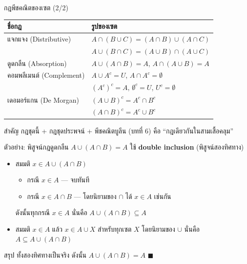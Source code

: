 \begin{frame}{กฎพีชคณิตของเซต (2/2)}
  \begin{center}\small
  \begin{tabular}{|l|l|}
    \hline
    \textbf{ชื่อกฎ} & \textbf{รูปของเซต} \\ \hline
    แจกแจง (Distributive) & $A \cap (B \cup C) = (A \cap B) \cup (A \cap C)$ \\ \hline
                          & $A \cup (B \cap C) = (A \cup B) \cap (A \cup C)$ \\ \hline
    ดูดกลืน (Absorption) & $A \cup (A \cap B) = A$, \quad $A \cap (A \cup B) = A$ \\ \hline
    คอมพลีเมนต์ (Complement) & $A \cup A^c = U$, \quad $A \cap A^c = \emptyset$ \\ \hline
                             & $(A^c)^c = A$, \quad $\emptyset^c = U$, \quad $U^c = \emptyset$ \\ \hline
    เดอมอร์แกน (De Morgan) & $(A \cup B)^c = A^c \cap B^c$ \\ \hline
                            & $(A \cap B)^c = A^c \cup B^c$ \\ \hline
  \end{tabular}
  \end{center}
  \vspace{0.3em}
  \begin{exampleblock}{สำคัญ}
    กฎชุดนี้ + กฎชุดประพจน์ + พีชคณิตบูลีน (บทที่ 6) คือ ``กฎเดียวกันในสามเสื้อคลุม''
  \end{exampleblock}
\end{frame}

\begin{frame}{ตัวอย่าง: พิสูจน์กฎดูดกลืน $A \cup (A \cap B) = A$}
  ใช้ \textbf{double inclusion} (พิสูจน์สองทิศทาง)
  \vspace{0.2em}
  \begin{itemize}
    \item[($\subseteq$)] สมมติ $x \in A \cup (A \cap B)$
      \begin{itemize}
        \item กรณี $x \in A$ --- จบทันที
        \item กรณี $x \in A \cap B$ --- โดยนิยามของ $\cap$ ได้ $x \in A$ เช่นกัน
      \end{itemize}
      ดังนั้นทุกกรณี $x \in A$ \quad นั่นคือ $A \cup (A \cap B) \subseteq A$
    \item[($\supseteq$)] สมมติ $x \in A$ แล้ว $x \in A \cup X$ สำหรับทุกเซต $X$
      โดยนิยามของ $\cup$ \quad นั่นคือ $A \subseteq A \cup (A \cap B)$
  \end{itemize}
  \vspace{0.3em}
  \begin{exampleblock}{สรุป}
    ทั้งสองทิศทางเป็นจริง ดังนั้น $A \cup (A \cap B) = A$ \hfill $\blacksquare$
  \end{exampleblock}
\end{frame}


